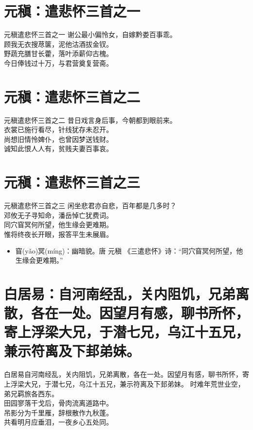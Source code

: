 \documentclass[12pt,oneside,a5paper]{book}
\begin{document}
\chapter{元稹：遣悲怀三首之一}
\begin{poemzh}{元稹}{遣悲怀三首之一}
谢公最小偏怜女，自嫁黔娄百事乖。\\
顾我无衣搜荩箧，泥他沽酒拔金钗。\\
野蔬充膳甘长藿，落叶添薪仰古槐。\\
今日俸钱过十万，与君营奠复营斋。\\ 
\end{poemzh}

\chapter{元稹：遣悲怀三首之二}
\begin{poemzh}{元稹}{遣悲怀三首之二}
昔日戏言身后事，今朝都到眼前来。\\
衣裳已施行看尽，针线犹存未忍开。\\
尚想旧情怜婢仆，也曾因梦送钱财。\\
诚知此恨人人有，贫贱夫妻百事哀。\\ 
\end{poemzh}

\chapter{元稹：遣悲怀三首之三}
\begin{poemzh}{元稹}{遣悲怀三首之三}
闲坐悲君亦自悲，百年都是几多时？\\
邓攸无子寻知命，潘岳悼亡犹费词。\\
同穴窅冥何所望，他生缘会更难期。\\
惟将终夜长开眼，报答平生未展眉。\\ 
\end{poemzh}

\begin{itemize}
\item 窅(yǎo)冥(míng)：幽暗貌。唐 元稹 《三遣悲怀》诗：“同穴窅冥何所望，他生缘会更难期。”
\end{itemize}

\chapter{白居易：自河南经乱，关内阻饥，兄弟离散，各在一处。因望月有感，聊书所怀，寄上浮梁大兄，于潜七兄，乌江十五兄，兼示符离及下邽弟妹。}
\begin{poemzh}{白居易}{自河南经乱，关内阻饥，兄弟离散，各在一处。因望月有感，聊书所怀，寄上浮梁大兄，于潜七兄，乌江十五兄，兼示符离及下邽弟妹。}
时难年荒世业空，弟兄羁旅各西东。\\
田园寥落干戈后，骨肉流离道路中。\\
吊影分为千里雁，辞根散作九秋蓬。\\
共看明月应垂泪，一夜乡心五处同。\\ 
\end{poemzh}
\end{document}
